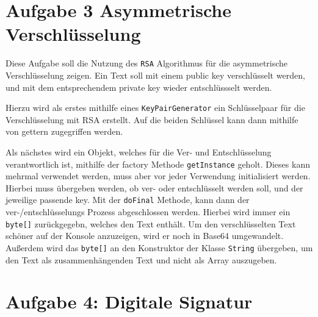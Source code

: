 \documentclass[12pt]{article}
\begin{document}
\section{Aufgabe 3 Asymmetrische Verschlüsselung}
Diese Aufgabe soll die Nutzung des \texttt{RSA} Algorithmus für die asymmetrische Verschlüsselung zeigen. Ein Text soll mit einem public key verschlüsselt werden, und mit dem entsprechendem private key wieder entschlüssselt werden.

Hierzu wird als erstes mithilfe eines \texttt{KeyPairGenerator} ein Schlüsselpaar für die Verschlüsselung mit RSA erstellt. Auf die beiden Schlüssel kann dann mithilfe von gettern zugegriffen werden.

Als nächstes wird ein Objekt, welches für die Ver- und Entschlüsselung verantwortlich ist, mithilfe der factory Methode \texttt{getInstance} geholt. Dieses kann mehrmal verwendet werden, muss aber vor jeder Verwendung initialisiert werden. Hierbei muss übergeben werden, ob ver- oder entschlüsselt werden soll, und der jeweilige passende key. 
Mit der \texttt{doFinal} Methode, kann dann der ver-/entschlüsselungs Prozess abgeschlossen werden. Hierbei wird immer ein \texttt{byte[]} zurückgegebn, welches den Text enthält. 
Um den verschlüsselten Text schöner auf der Konsole anzuzeigen, wird er noch in Base64 umgewandelt. Außerdem wird das \texttt{byte[]} an den Konstruktor der Klasse \texttt{String} übergeben, um den Text als zusammenhängenden Text und nicht als Array auszugeben.

\section{Aufgabe 4: Digitale Signatur}
\end{document}
